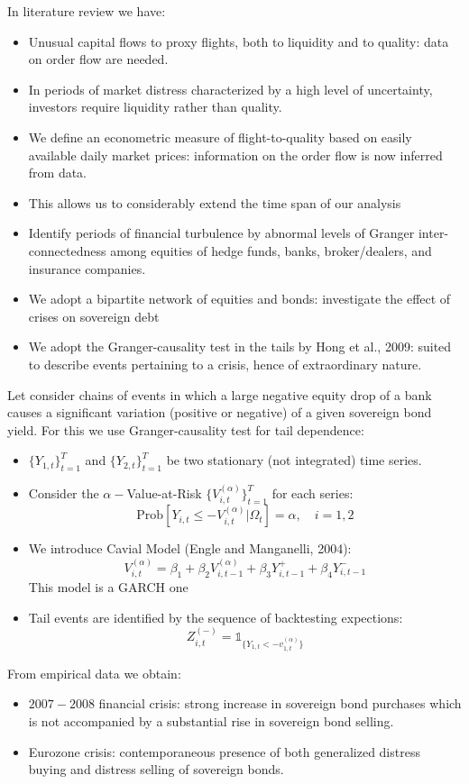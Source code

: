 In literature review we have:
\begin{itemize}
	\item Unusual capital flows to proxy flights, both to liquidity and to quality: data on order flow are needed.
	\item In periods of market distress characterized by a high level of uncertainty, investors require liquidity rather than quality. 
	\item We define an econometric measure of flight-to-quality based on easily available daily market prices: information on the order flow is now inferred from data.
	\item This allows us to considerably extend the time span of our analysis
	\item Identify periods of financial turbulence by abnormal levels of Granger inter-connectedness among equities of hedge funds, banks, broker/dealers, and insurance companies.
	\item We adopt a bipartite network of equities and bonds: investigate the effect of crises on sovereign debt
	\item We adopt the Granger-causality test in the tails by Hong et al., 2009: suited to describe events pertaining to a crisis, hence of extraordinary nature.
\end{itemize}
Let consider chains of events in which a large negative equity drop of a bank causes a significant variation (positive or negative) of a given sovereign bond yield. For this we use Granger-causality test for tail dependence:
\begin{itemize}
	\item $\{Y_{1,t}\}_{t=1}^T$ and $\{Y_{2,t}\}_{t=1}^T$ be two stationary (not integrated) time series.
	\item Consider the $\alpha-$Value-at-Risk $\{V_{i,t}^{(\alpha)}\}^T_{t=1}$ for each series:
	\[
	\text{Prob}[Y_{i,t} \leq - V_{i,t}^{(\alpha)}|\Omega_t] = \alpha, \quad i =1,2
	\]
	\item We introduce Cavial Model (Engle and Manganelli, 2004):
	\[
	V^{(\alpha)}_{i,t} = \beta_1 + \beta_2 V^{(\alpha)}_{i,t-1} + \beta_3 Y^+_{i,t-1} + \beta_4 Y^-_{i,t-1}
	\]
	This model is a GARCH one
	\item Tail events are identified by the sequence of backtesting expections:
	\[
	Z_{i,t}^{(-)} = \mathds{1}_{\{Y_{1,t}< -v^{(\alpha)}_{1,t}\}}
	\]
\end{itemize}
From empirical data we obtain:
\begin{itemize}
	\item $2007-2008$ financial crisis: strong increase in sovereign bond purchases which is not accompanied by a substantial rise in sovereign bond selling.
	\item Eurozone crisis: contemporaneous presence of both generalized distress buying and distress selling of sovereign bonds.
\end{itemize}
